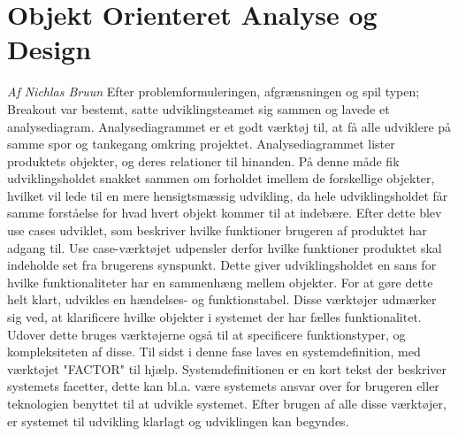 \section{Objekt Orienteret Analyse og Design}
\textit{Af Nichlas Bruun}\newline
Efter problemformuleringen, afgrænsningen  og spil typen; Breakout var bestemt, satte udviklingsteamet sig sammen og lavede et analysediagram. Analysediagrammet er et godt værktøj til, at få alle udviklere på samme spor og tankegang omkring projektet. Analysediagrammet lister produktets objekter, og deres relationer til hinanden. På denne måde fik udviklingsholdet snakket sammen om forholdet imellem de forskellige objekter, hvilket vil lede til en mere hensigtsmæssig udvikling, da hele udviklingsholdet får samme forståelse for hvad hvert objekt kommer til at indebære. Efter dette blev use cases udviklet, som beskriver hvilke funktioner brugeren af produktet har adgang til. Use case-værktøjet udpensler derfor hvilke funktioner produktet skal indeholde set fra brugerens synspunkt. Dette giver udviklingsholdet en sans for hvilke funktionaliteter har en sammenhæng mellem objekter. For at gøre dette helt klart, udvikles en hændelses- og funktionstabel. Disse værktøjer udmærker sig ved, at klarificere hvilke objekter i systemet der har fælles funktionalitet. Udover dette bruges værktøjerne også til at specificere funktionstyper, og kompleksiteten af disse. Til sidst i denne fase laves en systemdefinition, med værktøjet "FACTOR" til hjælp. Systemdefinitionen er en kort tekst der beskriver systemets facetter, dette kan bl.a. være systemets ansvar over for brugeren eller teknologien benyttet til at udvikle systemet. Efter brugen af alle disse værktøjer, er systemet til udvikling klarlagt og udviklingen kan begyndes.